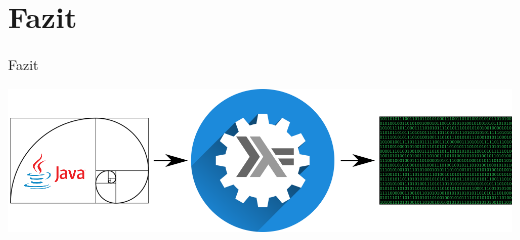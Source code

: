 \section{Fazit}

\begin{frame}{Fazit}

\begin{center}
	\includegraphics{images/fazit/fazit.png}
\end{center}

\end{frame}